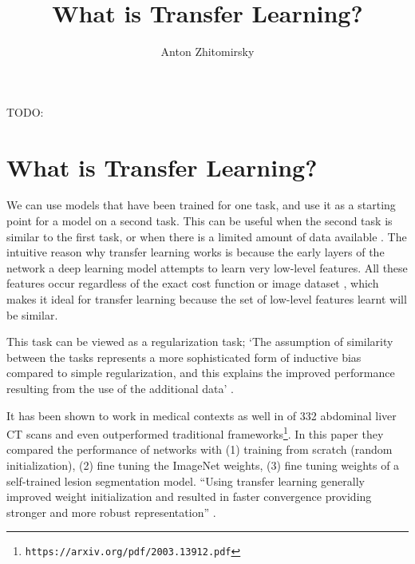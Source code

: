 \documentclass[11pt]{article}
\title{What is Transfer Learning?}
\author{Anton Zhitomirsky}
\begin{document}
\maketitle

TODO: \cite{concise-review-of-transfer-learning,comprehensive-survey-on-transfer-learning,what-is-being-transferred,transfer-learning-tutorial,transfer-learning-medium,transfer-learning-for-medical-image-classification-review,transfer-learning-in-medical-imaging,transfusion-medical-imaging,supervised-transfer-learning-at-scale,3d-medical-metric-analysis-2015, survey-on-transfer-learning, computer-vision-book}

\section{What is Transfer Learning?}

We can use models that have been trained for one task, and use it as a starting point for a model on a second task. This can be useful when the second task is similar to the first task, or when there is a limited amount of data available \cite{geeks-transfer-learning}. The intuitive reason why transfer learning works is because the early layers of the network a deep learning model attempts to learn very low-level features. All these features occur regardless of the exact cost function or image dataset \cite{geeks-transfer-learning}, which makes it ideal for transfer learning because the set of low-level features learnt will be similar.

\vspace{1em}

This task can be viewed as a regularization task; `The assumption of similarity between the tasks represents a more sophisticated form of inductive bias compared to simple regularization, and this explains the improved performance resulting from the use of the additional data' \cite{deep-learning-book}.

\vspace{1em}

It has been shown to work in medical contexts as well in \cite{liver-lesion-via-transfer-learning} of 332 abdominal liver CT scans and even outperformed traditional frameworks\footnote{\texttt{https://arxiv.org/pdf/2003.13912.pdf}}. In this paper they compared the performance of networks with (1) training from scratch (random initialization), (2) fine tuning the ImageNet weights, (3) fine tuning weights of a self-trained lesion segmentation model. ``Using transfer learning generally improved weight initialization and resulted in faster convergence providing stronger and more robust representation'' \cite{liver-lesion-via-transfer-learning}.
\end{document}
